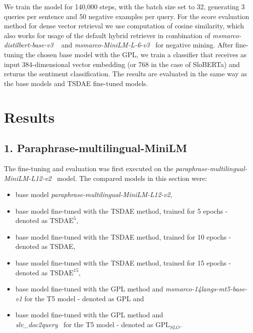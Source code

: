 \documentclass[fleqn,moreauthors,10pt]{ds_report}
\begin{document}
We train the model for 140,000 steps, with the batch size set to 32, generating 3 queries per sentence and 50 negative examples per query. For the score evaluation method for dense vector retrieval we use computation of cosine similarity, which also works for usage of the default hybrid retriever in combination of {\it msmarco-distilbert-base-v3 }~\cite{msmarcodistil} and {\it msmarco-MiniLM-L-6-v3}~\cite{msmarcominilm} for negative mining. After fine-tuning the chosen base model with the GPL, we train a classifier that receives as input 384-dimensional vector embedding (or 768 in the case of SloBERTa) and returns the sentiment classification. The results are evaluated in the same way as the base models and TSDAE fine-tuned models.





\section*{Results}


\subsection*{\large{1. Paraphrase-multilingual-MiniLM}}

The fine-tuning and evaluation was first executed on the {\it paraphrase-multilingual-MiniLM-L12-v2}~\cite{reimers-2019-sentence-bert} model. The compared models in this section were:
\begin{itemize}
	\item base model {\it paraphrase-multilingual-MiniLM-L12-v2},
	\item base model fine-tuned with the TSDAE method, trained for 5 epochs - denoted as $\text{TSDAE}^{5}$,
	\item base model fine-tuned with the TSDAE method, trained for 10 epochs - denoted as TSDAE,
	\item base model fine-tuned with the TSDAE method, trained for 15 epochs - denoted as $\text{TSDAE}^{15}$,
	\item base model fine-tuned with the GPL method and {\it msmarco-14langs-mt5-base-v1} \cite{msmarco14langs} for the T5 model - denoted as GPL and
	\item base model fine-tuned with the GPL method and \\{\it slv\_doc2query}~\cite{boshko} for the T5 model - denoted as $\text{GPL}_{SLO}$.
\end{itemize}
\end{document}
